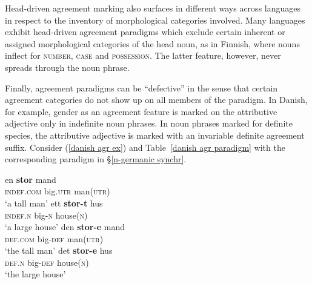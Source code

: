 Head\hyp{}driven agreement marking also surfaces in different ways across languages in respect to the inventory of morphological categories involved. Many languages exhibit head\hyp{}driven agreement paradigms which exclude certain inherent or assigned morphological categories of the head noun, as in Finnish, where nouns inflect for \textsc{number}, \textsc{case} and \textsc{possession}. The latter feature, however, never spreads through the noun phrase.
\begin{exe}
\ex
{}
\begin{xlist}
\end{xlist}
\end{exe}
Finally, agreement paradigms can be “defective” in the sense that certain agreement categories do not show up on all members of the paradigm. In Danish, for example, gender as an agreement feature is marked on the attributive adjective only in indefinite noun phrases. In noun phrases marked for definite species, the attributive adjective is marked with an invariable definite agreement suffix. Consider (\ref{danish agr ex}) and Table~\ref{danish agr paradigm} with the corresponding paradigm in \S\ref{n-germanic synchr}.
\begin{exe}
\ex 
{} \label{danish agr ex}
\begin{xlist}
\ex
\gll en \textbf{stor} mand\\
	\textsc{indef.com} big.\textsc{utr} man(\textsc{utr})\\
\glt	‘a tall man’
\ex
\gll ett \textbf{stor-t} hus\\
	\textsc{indef.n} big-\textsc{n} house(\textsc{n})\\
\glt	‘a large house’
\ex	
\gll den \textbf{stor-e} mand\\
	\textsc{def.com} big-\textsc{def} man(\textsc{utr})\\
\glt	‘the tall man’
\ex
\gll det \textbf{stor-e} hus\\
	\textsc{def.n} big-\textsc{def} house(\textsc{n})\\
\glt	‘the large house’
\end{xlist}
\end{exe}
